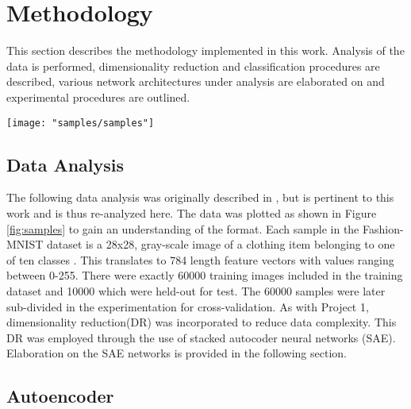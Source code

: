 \documentclass[conference]{IEEEtran}
\begin{document}
\section{Methodology} \label{Methodology}
	This section describes the methodology implemented in this work.  Analysis of the data is performed, dimensionality reduction and classification procedures are described, various network architectures under analysis are elaborated on and experimental procedures are outlined.

\begin{center}
	\begin{figure*}[ht!]
		\centering
		\texttt{[image: "samples/samples"]}
		\caption{Samples from the Fashion-MNIST dataset. One sample from each class was randomly chosen for visualization.  The gray-scale images are size 28x28, each representing an article of clothing.}
		\label{fig:samples}
	\end{figure*}
\end{center}

	\vspace{-1cm}
	\subsection{Data Analysis}
	 The following data analysis was originally described in \cite{McCurley2019PrincipeProject1}, but is pertinent to this work and is thus re-analyzed here.  The data was plotted as shown in Figure \ref{fig:samples} to gain an understanding of the format.  Each sample in the Fashion-MNIST dataset is a 28x28, gray-scale image of a clothing item belonging to one of ten classes \cite{Xiao2017FashionMNIST}. This translates to 784 length feature vectors with values ranging between 0-255. There were exactly 60000 training images included in the  training dataset and 10000 which were held-out for test.  The 60000 samples were later sub-divided in the experimentation for cross-validation.  As with Project 1, dimensionality reduction(DR) was incorporated to reduce data complexity.  This DR was employed through the use of stacked autocoder neural networks (SAE).  Elaboration on the SAE networks is provided in the following section.

	\vspace{-0.1cm}
	 \subsection{Autoencoder} 
\end{document}
